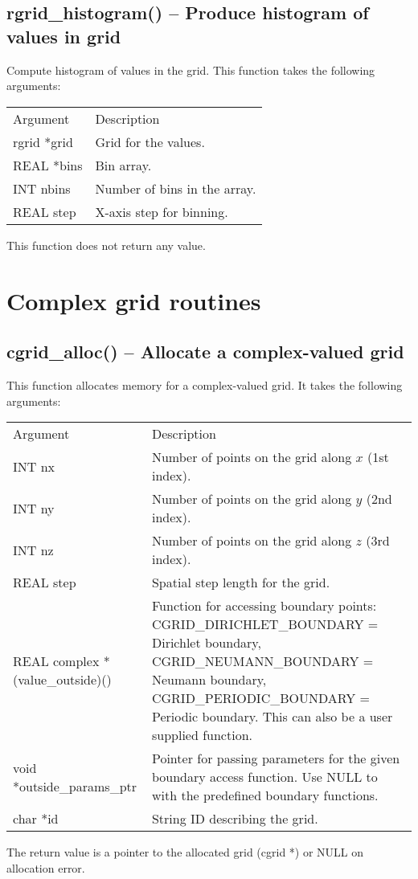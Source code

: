\documentclass[12pt,letterpaper]{report}
\begin{document}
\subsection{rgrid\_histogram() -- Produce histogram of values in grid}

Compute histogram of values in the grid. This function takes the following arguments:
\begin{longtable}{p{} p{}}
Argument & Description\\
\cline{1-2}
rgrid *grid & Grid for the values.\\
REAL *bins & Bin array.\\
INT nbins & Number of bins in the array.\\
REAL step & X-axis step for binning.\\
\end{longtable}
\noindent
This function does not return any value.\\

\section{Complex grid routines}

\subsection{cgrid\_alloc() -- Allocate a complex-valued grid}

This function allocates memory for a complex-valued grid. It takes the following arguments:
\begin{longtable}{p{} p{}}
Argument & Description\\
\cline{1-2}
INT nx & Number of points on the grid along $x$ (1st index).\\
INT ny & Number of points on the grid along $y$ (2nd index).\\
INT nz & Number of points on the grid along $z$ (3rd index).\\
REAL step & Spatial step length for the grid.\\
REAL complex *(value\_outside)() & Function for accessing boundary points: CGRID\_DIRICHLET\_BOUNDARY = Dirichlet boundary, CGRID\_NEUMANN\_BOUNDARY = Neumann boundary, CGRID\_PERIODIC\_BOUNDARY  = Periodic boundary. This can also be a user supplied function.\\
void *outside\_params\_ptr & Pointer for passing parameters for the given boundary access function. Use NULL to with the predefined boundary functions.\\
char *id & String ID describing the grid.
\end{longtable}
\noindent
The return value is a pointer to the allocated grid (cgrid *) or NULL on allocation error.
\end{document}
